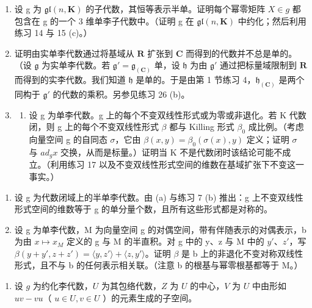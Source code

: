 \begin{enumerate}
\def\labelenumi{\arabic{enumi}.}
\setcounter{enumi}{15}
\item
  设 g 为 \(\mathfrak{gl}(n,\mathbf{K})\) 的子代数，其恒等表示半单。证明每个幂零矩阵 \(X\in g\) 都包含在 g 的一个 3 维单李子代数中。（证明 g 在 \(\mathfrak{gl}(n,\mathbf{K})\) 中约化；然后利用练习 14 与 15 (c)。）
\item
  证明由实单李代数通过将基域从 \(\mathbf{R}\) 扩张到 \(\mathbf{C}\) 而得到的代数并不总是单的。（设 \(\mathfrak{g}\) 为实单李代数。若 \(\mathfrak{g}' = \mathfrak{g}_{(\mathbf{C})}\) 单，设 \(\mathfrak{h}\) 为由 \(\mathfrak{g}'\) 通过把标量域限制到 \(\mathbf{R}\) 而得到的实李代数。我们知道 \(\mathfrak{h}\) 是单的。于是由第 1 节练习 4，\(\mathfrak{h}_{(\mathbf{C})}\) 是两个同构于 \(\mathfrak{g}'\) 的代数的乘积。另参见练习 26 (b)。
\item
  \begin{enumerate}
  \def\labelenumii{(\alph{enumii})}
  \tightlist
  \item
    设 g 为单李代数。g 上的每个不变双线性形式或为零或非退化。若 K 代数闭，则 g 上的每个不变双线性形式 \(\beta\) 都与 Killing 形式 \(\beta_{0}\) 成比例。（考虑向量空间 g 的自同态 \(\sigma\)，它由 \(\beta(x,y)=\beta_{0}(\sigma(x),y)\) 定义；证明 \(\sigma\) 与 \(ad_{g}x\) 交换，从而是标量。）证明当 K 不是代数闭时该结论可能不成立。（利用练习 17 以及不变双线性形式空间的维数在基域扩张下不变这一事实。）
  \end{enumerate}
\end{enumerate}

\begin{enumerate}
\def\labelenumi{(\alph{enumi})}
\setcounter{enumi}{1}
\item
  设 g 为代数闭域上的半单李代数。由 (a) 与练习 7 (b) 推出：g 上不变双线性形式空间的维数等于 g 的单分量个数，且所有这些形式都是对称的。
\item
  设 g 为单李代数，M 为向量空间 g 的对偶空间，带有伴随表示的对偶表示，b 为由 \(x \mapsto x_{M}\) 定义的 g 与 M 的半直积。对 g 中的 y、z 与 M 中的 \(y'\)、\(z'\)，写 \(\beta(y + y', z + z') = \langle y, z' \rangle + \langle z, y' \rangle\)。证明 \(\beta\) 是 b 上的非退化不变对称双线性形式，且不与 b 的任何表示相关联。（注意 b 的根基与幂零根基都等于 M。）
\end{enumerate}

\begin{enumerate}
\def\labelenumi{\arabic{enumi}.}
\setcounter{enumi}{18}
\tightlist
\item
  设 \(g\) 为约化李代数，\(U\) 为其包络代数，\(Z\) 为 \(U\) 的中心，\(V\) 为 \(U\) 中由形如 \(uv - vu\)（ \(u \in U, v \in U\) ）的元素生成的子空间。
\end{enumerate}

